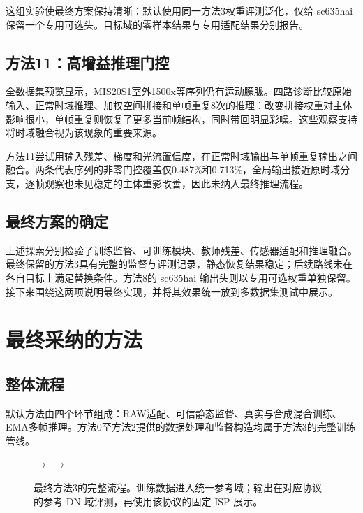 \documentclass[11pt,a4paper,UTF8,fontset=fandol]{ctexart}
\begin{document}
这组实验使最终方案保持清晰：默认使用同一方法3权重评测泛化，仅给 sc635hai 保留一个专用可选头。目标域的零样本结果与专用适配结果分别报告。

\subsection{方法11：高增益推理门控}

全数据集预览显示，MIS20S1室外1500x等序列仍有运动朦胧。四路诊断比较原始输入、正常时域推理、加权空间拼接和单帧重复8次的推理：改变拼接权重对主体影响很小，单帧重复则恢复了更多当前帧结构，同时带回明显彩噪。这些观察支持将时域融合视为该现象的重要来源。

方法11尝试用输入残差、梯度和光流置信度，在正常时域输出与单帧重复输出之间融合。两条代表序列的非零门控覆盖仅0.487\%和0.713\%，全局输出接近原时域分支，逐帧观察也未见稳定的主体重影改善，因此未纳入最终推理流程。

\subsection{最终方案的确定}

上述探索分别检验了训练监督、可训练模块、教师残差、传感器适配和推理融合。最终保留的方法3具有完整的监督与评测记录，静态恢复结果稳定；后续路线未在各自目标上满足替换条件。方法8的 sc635hai 输出头则以专用可选权重单独保留。接下来围绕这两项说明最终实现，并将其效果统一放到多数据集测试中展示。

\section{最终采纳的方法}
\label{sec:adopted}

\subsection{整体流程}

默认方法由四个环节组成：RAW适配、可信静态监督、真实与合成混合训练、EMA多帧推理。方法0至方法2提供的数据处理和监督构造均属于方法3的完整训练管线。

\begin{figure}[H]
\centering\small
{}
$\longrightarrow$
$\longrightarrow$
\caption{最终方法3的完整流程。训练数据进入统一参考域；输出在对应协议的参考 DN 域评测，再使用该协议的固定 ISP 展示。}
\label{fig:adopted_pipeline}
\end{figure}
\end{document}
